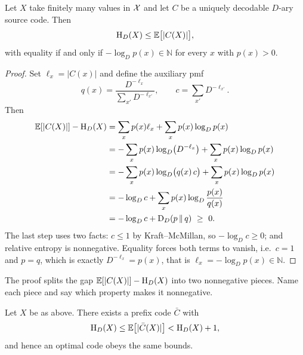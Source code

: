 
\begin{theorem}\label{thm:source-coding-symbol}
Let $X$ take finitely many values in $\mathcal{X}$ and let $C$ be a uniquely decodable
$D$-ary source code. Then
\[
  \mathrm{H}_D(X)\le\mathbb{E}\bigl[|C(X)|\bigr],
\]
with equality if and only if $-\log_Dp(x)\in\mathbb{N}$ for every $x$ with
$p(x)>0$.
\end{theorem}

\begin{proof}
Set $\ell_x=|C(x)|$ and define the auxiliary pmf
\[
  q(x)=\frac{D^{-\ell_x}}{\sum_{x'}D^{-\ell_{x'}}},
  \qquad
  c=\sum_{x'}D^{-\ell_{x'}}.
\]
Then
\[
\begin{aligned}
  \mathbb{E}[|C(X)|]-\mathrm{H}_D(X)
  &=\sum_xp(x)\ell_x+\sum_xp(x)\log_Dp(x)\\
  &=-\sum_xp(x)\log_D\!\left(D^{-\ell_x}\right)+\sum_xp(x)\log_Dp(x)\\
  &=-\sum_xp(x)\log_D\bigl(q(x)\,c\bigr)+\sum_xp(x)\log_Dp(x)\\
  &=-\log_Dc+\sum_xp(x)\log_D\frac{p(x)}{q(x)}\\
  &=-\log_Dc+\mathrm{D}_D(p\,\|\,q)\ \ge\ 0.
\end{aligned}
\]
The last step uses two facts: $c\le1$ by Kraft--McMillan, so $-\log_Dc\ge0$;
and relative entropy is nonnegative. Equality forces both terms to vanish,
i.e.\ $c=1$ and $p=q$, which is exactly $D^{-\ell_x}=p(x)$, that is
$\ell_x=-\log_Dp(x)\in\mathbb{N}$.
\end{proof}

\begin{yourturn}
The proof splits the gap $\mathbb{E}[|C(X)|]-\mathrm{H}_D(X)$ into two nonnegative pieces.
Name each piece and say which property makes it nonnegative.
\ifshowanswers\else\workspace[2]\fi
{}
\end{yourturn}


\begin{proposition}\label{prop:shannon-code}
Let $X$ be as above. There exists a prefix code $\bar C$ with
\[
  \mathrm{H}_D(X)\le\mathbb{E}\bigl[|\bar C(X)|\bigr]<\mathrm{H}_D(X)+1,
\]
and hence an optimal code obeys the same bounds.
\end{proposition}

